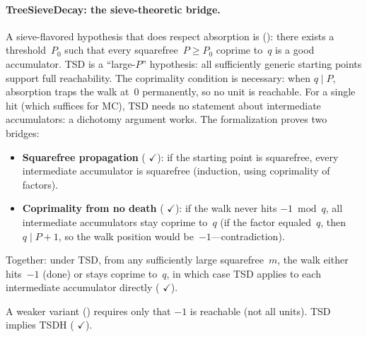 \paragraph{TreeSieveDecay: the sieve-theoretic bridge.}
A sieve-flavored hypothesis that does respect absorption is
():
there exists a threshold~$P_0$ such that every squarefree~$P \geq P_0$
coprime to~$q$ is a good accumulator.
TSD is a ``large-$P$'' hypothesis: all sufficiently generic starting
points support full reachability.
The coprimality condition is necessary: when $q \mid P$, absorption
traps the walk at~$0$ permanently, so no unit is reachable.
For a single hit (which suffices for MC), TSD needs no statement about
intermediate accumulators: a dichotomy argument works.
The formalization proves two bridges:
\begin{itemize}
\item \textbf{Squarefree propagation}
(
{\color{leanink}$\checkmark$}):
if the starting point is squarefree, every intermediate accumulator
is squarefree (induction, using coprimality of factors).
\item \textbf{Coprimality from no death}
(
{\color{leanink}$\checkmark$}):
if the walk never hits $-1 \bmod q$, all intermediate accumulators
stay coprime to~$q$ (if the factor equaled~$q$, then
$q \mid P{+}1$, so the walk position would be~$-1$---contradiction).
\end{itemize}
Together: under TSD, from any sufficiently large squarefree~$m$,
the walk either hits~$-1$ (done) or stays coprime to~$q$, in which
case TSD applies to each intermediate accumulator directly
(
{\color{leanink}$\checkmark$}).

A weaker variant 
()
requires only that $-1$ is reachable (not all units).
TSD implies TSDH
(
{\color{leanink}$\checkmark$}).

